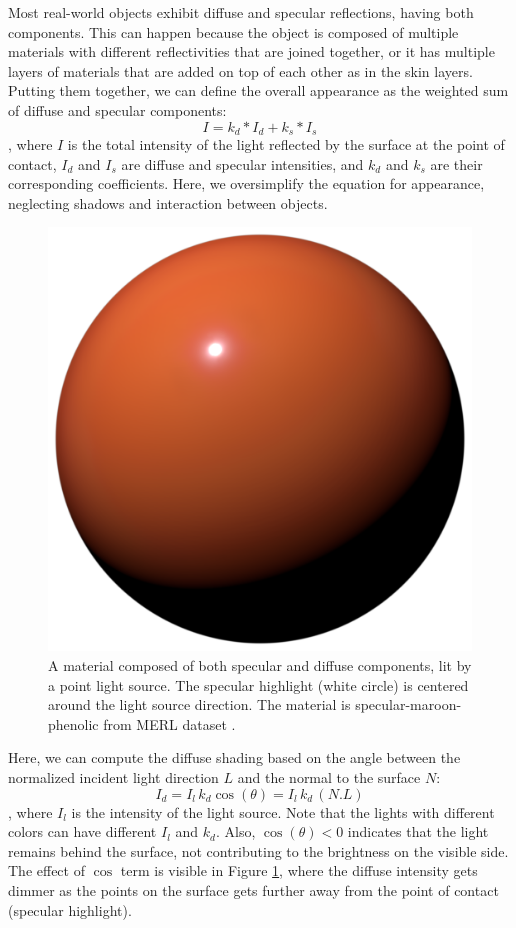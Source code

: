 Most real-world objects exhibit diffuse and specular reflections, having both components. This can happen because the object is composed of multiple materials with different reflectivities that are joined together, or it has multiple layers of materials that are added on top of each other as in the skin layers. Putting them together, we can define the overall appearance as the weighted sum of diffuse and specular components: $$I = k_d * I_d + k_s * I_s$$, where $I$ is the total intensity of the light reflected by the surface at the point of contact, $I_d$ and $I_s$  are diffuse and specular intensities, and $k_d$ and $k_s$ are their corresponding coefficients. Here, we oversimplify the equation for appearance, neglecting shadows and interaction between objects.



\begin{figure}
  \centering
   \includegraphics[width=0.5\linewidth]{Images/specular+diffuse.png}
   \caption{A material composed of both specular and diffuse components, lit by a point light source. The specular highlight (white circle) is centered around the light source direction. The material is specular-maroon-phenolic from MERL dataset \cite{Matusik2003jul}.}
   \label{fig:diffuse+spec}
\end{figure}


Here, we can compute the diffuse shading based on the angle between the normalized incident light direction $L$ and the normal to the surface $N$:
$$I_d = I_l \, k_d \cos(\theta) = I_l \, k_d \, (N . L)$$,  where $I_l$ is the intensity of the light source. Note that the lights with different colors can have different $I_l$ and $k_d$. Also, $\cos(\theta) < 0$ indicates that the light remains behind the surface, not contributing to the brightness on the visible side. The effect of $\cos$ term is visible in Figure \ref{fig:diffuse+spec}, where the diffuse intensity gets dimmer as the points on the surface gets further away from the point of contact (specular highlight). 

